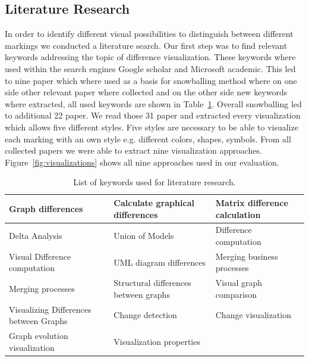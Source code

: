 \documentclass{llncs}
\begin{document}
\subsection{Literature Research} %
\label{sec:LitResearch}
In order to identify different visual possibilities to distinguish between different markings we conducted a literature search. Our first step was to find relevant keywords addressing the topic of difference visualization. These keywords where used within the search engines Google scholar and Microsoft academic. This led to nine paper which where used as a basis for snowballing method where on one side other relevant paper where collected and on the other side new keywords where extracted, all used keywords are shown in Table~\ref{table:Keywords}. Overall snowballing led to additional 22 paper. We read those 31 paper and extracted every visualization which allows five different styles. Five styles are necessary to be able to visualize each marking with an own style e.g. different colors, shapes, symbols. From all collected papers we were able to extract nine visualization approaches. Figure~\ref{fig:visualizations} shows all nine approaches used in our evaluation.

\begin{table}
	\centering
		\begin{tabular}{|p{4cm}|p{4cm}|p{4cm}|}
			\hline
			Graph differences & Calculate graphical differences & Matrix difference calculation 	\\
			\hline
			Delta Analysis & Union of Models &  Difference computation 	\\
			\hline
			Visual Difference computation & UML diagram differences &  Merging business processes 	\\
			\hline
			Merging processes  & Structural differences between graphs & Visual graph comparison 	\\
			\hline
			Visualizing Differences between Graphs & Change detection & Change visualization 	\\
			\hline
			Graph evolution visualization & Visualization properties &  	\\
			\hline
		\end{tabular}
		\vspace{10pt}
\caption{List of keywords used for literature research.}
\label{table:Keywords}
\end{table}
\end{document}
